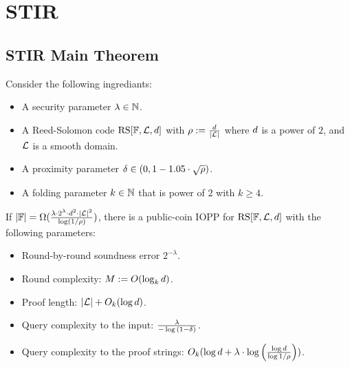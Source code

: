 \chapter{STIR}
\section{STIR Main Theorem}\label{sec:stir_thm}
\begin{theorem}\label{thm:stir}
    Consider the following ingrediants:
    \begin{itemize}
        \item A security parameter $\lambda\in\mathbb{N}$.
        \item A Reed-Solomon code $\mathrm{RS}[\mathbb{F},\mathcal{L},d]$ with $\rho:=\frac{d}{|\mathcal{L}|}$ where $d$ is a power of $2$, and $\mathcal{L}$ is a smooth domain.
        \item A proximity parameter $\delta\in(0,1-1.05\cdot\sqrt{\rho})$.
        \item A folding parameter $k\in\mathbb{N}$ that is power of $2$ with $k\geq 4$.
    \end{itemize}
If $|\mathbb{F}|=\Omega(\frac{\lambda\cdot2^\lambda\cdot d^2\cdot{|\mathcal{L}|}^2}{\log(1/\rho)})$, there is a public-coin IOPP for $\mathrm{RS}[\mathbb{F},\mathcal{L},d]$ with the following parameters:
\begin{itemize}
    \item Round-by-round soundness error $2^{-\lambda}$.
    \item Round complexity: $M:=O(\log_k{d})$.
    \item Proof length: $|\mathcal{L}|+O_k(\log{d})$.
    \item Query complexity to the input: $\frac{\lambda}{-\log{(1-\delta)}}$.
    \item Query complexity to the proof strings: $O_k(\log{d}+\lambda\cdot\log{\Big(\frac{\log{d}}{\log{1/\rho}}\Big)})$.
\end{itemize}
\end{theorem}


